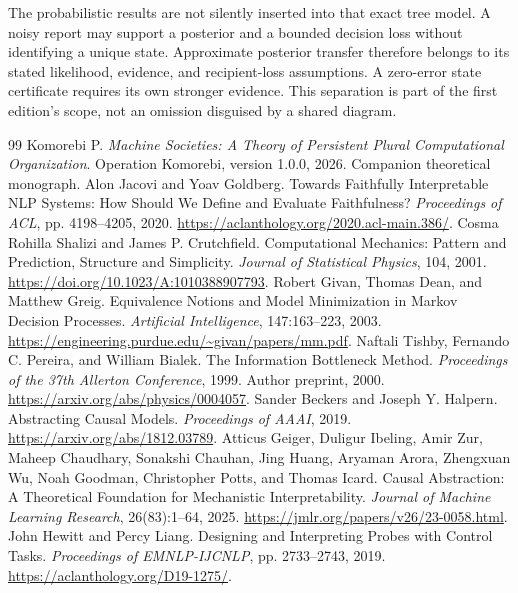 \documentclass[11pt,letterpaper]{article}
\theoremstyle{plain}
\theoremstyle{definition}
\begin{document}
The probabilistic results are not silently inserted into that exact tree model. A noisy report may support a posterior and a bounded decision loss without identifying a unique state. Approximate posterior transfer therefore belongs to its stated likelihood, evidence, and recipient-loss assumptions. A zero-error state certificate requires its own stronger evidence. This separation is part of the first edition's scope, not an omission disguised by a shared diagram.

\clearpage
{}
\begin{thebibliography}{99}\fontsize{9.5}{11}\selectfont
\setlength{\itemsep}{3pt}\setlength{\parsep}{0pt}\setlength{\parskip}{0pt}
 Komorebi P. \emph{Machine Societies: A Theory of Persistent Plural Computational Organization}. Operation Komorebi, version 1.0.0, 2026. Companion theoretical monograph.
 Alon Jacovi and Yoav Goldberg. Towards Faithfully Interpretable NLP Systems: How Should We Define and Evaluate Faithfulness? \emph{Proceedings of ACL}, pp. 4198--4205, 2020. \url{https://aclanthology.org/2020.acl-main.386/}.
 Cosma Rohilla Shalizi and James P. Crutchfield. Computational Mechanics: Pattern and Prediction, Structure and Simplicity. \emph{Journal of Statistical Physics}, 104, 2001. \url{https://doi.org/10.1023/A:1010388907793}.
 Robert Givan, Thomas Dean, and Matthew Greig. Equivalence Notions and Model Minimization in Markov Decision Processes. \emph{Artificial Intelligence}, 147:163--223, 2003. \url{https://engineering.purdue.edu/~givan/papers/mm.pdf}.
 Naftali Tishby, Fernando C. Pereira, and William Bialek. The Information Bottleneck Method. \emph{Proceedings of the 37th Allerton Conference}, 1999. Author preprint, 2000. \url{https://arxiv.org/abs/physics/0004057}.
 Sander Beckers and Joseph Y. Halpern. Abstracting Causal Models. \emph{Proceedings of AAAI}, 2019. \url{https://arxiv.org/abs/1812.03789}.
 Atticus Geiger, Duligur Ibeling, Amir Zur, Maheep Chaudhary, Sonakshi Chauhan, Jing Huang, Aryaman Arora, Zhengxuan Wu, Noah Goodman, Christopher Potts, and Thomas Icard. Causal Abstraction: A Theoretical Foundation for Mechanistic Interpretability. \emph{Journal of Machine Learning Research}, 26(83):1--64, 2025. \url{https://jmlr.org/papers/v26/23-0058.html}.
 John Hewitt and Percy Liang. Designing and Interpreting Probes with Control Tasks. \emph{Proceedings of EMNLP-IJCNLP}, pp. 2733--2743, 2019. \url{https://aclanthology.org/D19-1275/}.

\end{thebibliography}
\end{document}
